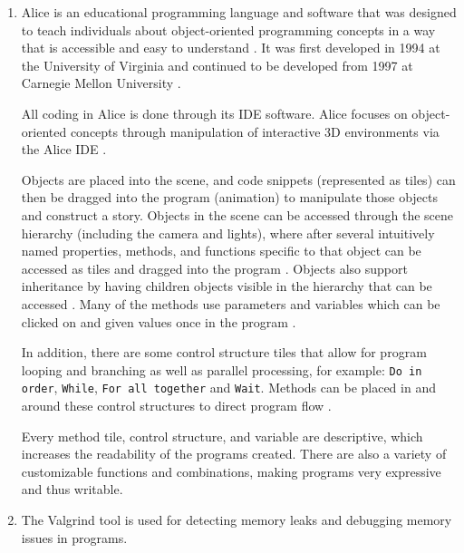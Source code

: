 \documentclass{article}
\begin{document}
\begin{enumerate}
    \item Alice is an educational programming language and software that was designed to teach individuals about object-oriented programming concepts in a way that is accessible and easy to understand \cite{WikimediaFoundation_2023c}. It was first developed in 1994 at the University of Virginia and continued to be developed from 1997 at Carnegie Mellon University \cite{WikimediaFoundation_2023c}.
    
    All coding in Alice is done through its IDE software. Alice focuses on object-oriented concepts through manipulation of interactive 3D environments via the Alice IDE \cite{WikimediaFoundation_2023c}. 
    
    Objects are placed into the scene, and code snippets (represented as tiles) can then be dragged into the program (animation) to manipulate those objects and construct a story. Objects in the scene can be accessed through the scene hierarchy (including the camera and lights), where after several intuitively named properties, methods, and functions specific to that object can be accessed as tiles and dragged into the program \cite{WikimediaFoundation_2023c}. Objects also support inheritance by having children objects visible in the hierarchy that can be accessed \cite{WikimediaFoundation_2023c}. Many of the methods use parameters and variables which can be clicked on and given values once in the program \cite{WikimediaFoundation_2023c}. 
    
    In addition, there are some control structure tiles that allow for program looping and branching as well as parallel processing, for example: \verb|Do in order|, \verb|While|, \verb|For all together| and \verb|Wait|. Methods can be placed in and around these control structures to direct program flow \cite{WikimediaFoundation_2023c}.
    
    Every method tile, control structure, and variable are descriptive, which increases the readability of the programs created. There are also a variety of customizable functions and combinations, making programs very expressive and thus writable. \\
    
    \item The Valgrind tool is used for detecting memory leaks and debugging memory issues in programs. 


\end{enumerate}



\end{document}
